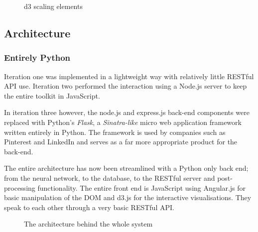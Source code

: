 \documentclass[a4paper,11pt,titlepage]{article}
\begin{document}
	\begin{figure}[H]
    			\caption{d3 scaling elements}%
	\end{figure}	
		
	\subsection{Architecture}
	
		\subsubsection{Entirely Python}
	Iteration one was implemented in a lightweight way with relatively little RESTful API use. Iteration two performed the interaction using a Node.js server to keep the entire toolkit in JavaScript.
	\par 
	In iteration three however, the node.js and express.js back-end components were replaced with Python's \textit{Flask}, a \textit{Sinatra-like} micro web application framework written entirely in Python.  The framework is used by companies such as Pinterest and LinkedIn and serves as a far more appropriate product for the back-end.
	\par 
	The entire architecture has now been streamlined with a Python only back end; from the neural network, to the database, to the RESTful server and post-processing functionality. The entire front end is JavaScript using Angular.js for basic manipulation of the DOM and d3.js for the interactive visualisations. They speak to each other through a very basic RESTful API.
	\begin{figure}[H]
    			\caption{The architecture behind the whole system}%
	\end{figure}	
	
\end{document}
